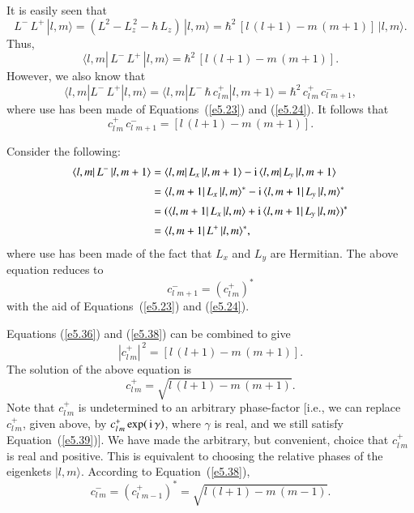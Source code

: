 It is easily seen that
\begin{equation}
L^- \,L^+ \,|l, m\rangle = (L^2 - L_z^{\,2}-\hbar\, L_z)\,|l, m \rangle
= \hbar^2 \,[l\,(l+1) - m\,(m+1)]\,|l,m\rangle.
\end{equation}
Thus,
\begin{equation}
\langle l,m|\, L^- \,L^+\,| l,m\rangle =\hbar^2 \,[l\,(l+1) - m\,(m+1)].
\end{equation}
However, we also know that
\begin{equation}
\langle l,m| L^- \,L^+ |l,m\rangle = \langle l, m| L^-\, \hbar\, c^+_{l\,m}
|l,m+1\rangle = \hbar^2\,  c^+_{l\,m} \,c^{-}_{l\,\, m+1},
\end{equation}
where use has been made of Equations~(\ref{e5.23}) and (\ref{e5.24}). 
It follows that
\begin{equation}\label{e5.36}
 c^+_{l\,m}\, c^{-}_{l\,\,m+1} = [l\,(l+1) - m\,(m+1)].
\end{equation}

Consider the following:
\begin{align}
\langle l, m|\, L^-\, |l, m+1\rangle &=
\langle l, m|\,L_x\,|l,m+1 \rangle - {\rm i}\, \langle l, m| \,L_y\,|l,m+1 \rangle \nonumber
\\[0.5ex]
&= \langle l, m+1| \,L_x\,|l,m \rangle^\ast - {\rm i}\, \langle l, m+1|\, L_y\,|l,m \rangle^\ast\nonumber\\[0.5ex]
&=( \langle l, m+1|\, L_x\,|l,m \rangle + {\rm i}\, 
\langle l, m+1|\, L_y\,|l,m \rangle)^\ast\nonumber\\[0.5ex]
&= \langle l, m+1|\,L^+\,|l, m\rangle^\ast,
\end{align}
where use has been made of the fact that $L_x$ and $L_y$ are Hermitian.
The above equation reduces to
\begin{equation}\label{e5.38}
c^-_{l\,\, m+1} = (c_{l\,m}^+)^\ast
\end{equation}
with the aid of Equations~(\ref{e5.23}) and (\ref{e5.24}). 

Equations (\ref{e5.36}) and (\ref{e5.38}) can be combined to give
\begin{equation}\label{e5.39}
|c^+_{l\,m}|^{\,2} = [l\,(l+1) - m \,(m+1)].
\end{equation}
The solution of the above equation is
\begin{equation}
c_{l\,m}^+ = \sqrt{l\,(l+1)- m \,(m+1)}.
\end{equation}
Note that $c_{l\,m}^+$ is undetermined to an arbitrary phase-factor
[{\rm i.e.}, we can replace $c_{l\, m}^+$, given above, by $c_{l\, m}^+\exp(\,{\rm i}\,\gamma)$,
where $\gamma$ is real, and we still satisfy Equation~(\ref{e5.39})]. We have made the arbitrary, but convenient, choice that $c_{l\,m}^+$ is real and positive. This is equivalent
to choosing  the relative phases of the eigenkets $|l, m\rangle$. 
According to Equation~(\ref{e5.38}),
\begin{equation}\label{e5.41}
c_{l\, m}^- = (c_{l\, \,m-1}^+)^\ast =  \sqrt{l\,(l+1)- m\, (m-1)}.
\end{equation}

